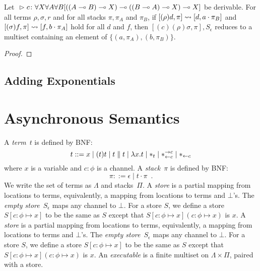 \begin{proposition}
 Let
 ${}\vartriangleright{}{ {c} \colon{\forall X\forall A\forall B
 [((A\multimap B)\multimap X)
  \multimap((B\multimap A)\multimap X)
  \multimap X]} }$
 be
 derivable.
 For all terms $\rho,\sigma, r$ and for all stacks $\pi, \pi_A$ and
 $\pi_B$,
 if $[(\rho)d  ,\pi]\rightsquigarrow [d,a\cdot \pi_B]$ and
    $[(\sigma)f,\pi]\rightsquigarrow [f,b\cdot \pi_A]$ hold for all $d$ and $f$,
 then
 $[(c)(\rho)\sigma,\pi],S_\epsilon$ reduces to a multiset containing an
 element of
 $\{(a,\pi_A),(b,\pi_B)\}$.
\end{proposition}
\begin{proof}
\end{proof}

\subsection{Adding Exponentials}


\section{Asynchronous Semantics}

A \textit{term}~$t$ is defined by BNF:
\[
 t::= x
 \mid (t)t
 \mid t\parallel t
 \mid \lambda x.t
 \mid \ast_t
 \mid \ast^{\rightarrow {c}}_{\leftarrow{c}}
 \mid \ast_{\leftarrow{c}}
\]
where $x$ is a variable and $c\colon\phi$ is a channel.
A \textit{stack}~$\pi$ is defined by BNF:
\[
 \pi ::= \epsilon
 \mid t\cdot \pi
 \enspace.
\]
We write the set of terms as $\Lambda$ and stacks~$\Pi$.
A \textit{store} is a partial mapping from locations to
terms, equivalently, a mapping from locations to terms and $\bot$'s.
The \textit{empty store}~$S_\epsilon$ maps any channel to $\bot$.
For a store $S$, we define a store $S[c\colon\phi\mapsto x]$ to be
the same as $S$ except that $S[c\colon\phi\mapsto x](c\colon\phi\mapsto
x)$ is $x$.
A \textit{store} is a partial mapping from locations to
terms, equivalently, a mapping from locations to terms and $\bot$'s.
The \textit{empty store}~$S_\epsilon$ maps any channel to $\bot$.
For a store $S$, we define a store $S[c\colon\phi\mapsto x]$ to be
the same as $S$ except that $S[c\colon\phi\mapsto x](c\colon\phi\mapsto
x)$ is $x$.
An \textit{executable} is a finite multiset on $\Lambda \times \Pi$,
paired with a store.

